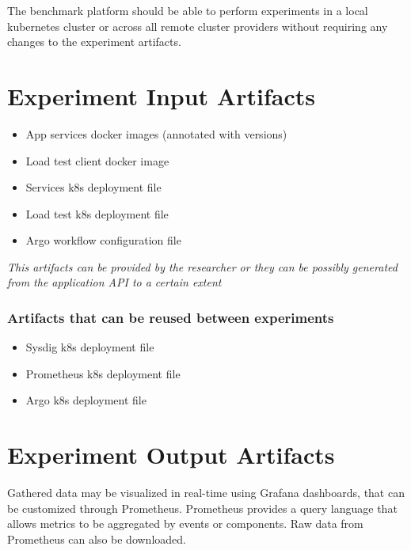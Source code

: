 The benchmark platform should be able to perform experiments in a local kubernetes cluster or across all remote cluster providers without requiring any changes to the experiment artifacts.

\newpage

\section{Experiment Input Artifacts}
\begin{itemize}
    \item  App services docker images (annotated with versions)

    \item Load test client docker image

    \item Services k8s deployment file

    \item Load test k8s deployment file

    \item Argo workflow configuration file
\end{itemize}
\textit{This artifacts can be provided by the researcher or they can be possibly generated from the application API to a certain extent}

\subsubsection*{Artifacts that can be reused between experiments }
\begin{itemize}
    \item Sysdig k8s deployment file
    \item Prometheus k8s deployment file
    \item Argo k8s deployment file
\end{itemize}

\section{Experiment Output Artifacts}

Gathered data may be visualized in real-time using Grafana dashboards, that can be customized through Prometheus.
Prometheus provides a query language that allows metrics to be aggregated by events or components.
Raw data from Prometheus can also be downloaded.